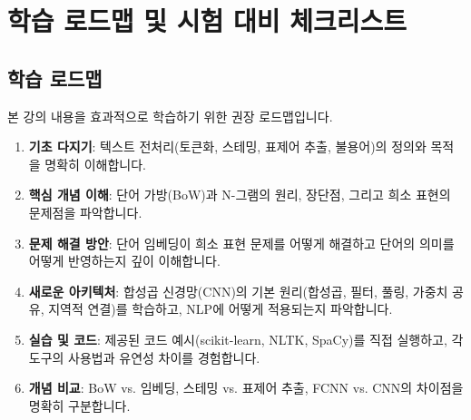 \documentclass[11pt,a4paper]{article}
\theoremstyle{definition}
\begin{document}
\newpage
\section{학습 로드맵 및 시험 대비 체크리스트}

\subsection{학습 로드맵}
본 강의 내용을 효과적으로 학습하기 위한 권장 로드맵입니다.
\begin{enumerate}
    \item \textbf{기초 다지기}: 텍스트 전처리(토큰화, 스테밍, 표제어 추출, 불용어)의 정의와 목적을 명확히 이해합니다.
    \item \textbf{핵심 개념 이해}: 단어 가방(BoW)과 N-그램의 원리, 장단점, 그리고 희소 표현의 문제점을 파악합니다.
    \item \textbf{문제 해결 방안}: 단어 임베딩이 희소 표현 문제를 어떻게 해결하고 단어의 의미를 어떻게 반영하는지 깊이 이해합니다.
    \item \textbf{새로운 아키텍처}: 합성곱 신경망(CNN)의 기본 원리(합성곱, 필터, 풀링, 가중치 공유, 지역적 연결)를 학습하고, NLP에 어떻게 적용되는지 파악합니다.
    \item \textbf{실습 및 코드}: 제공된 코드 예시(scikit-learn, NLTK, SpaCy)를 직접 실행하고, 각 도구의 사용법과 유연성 차이를 경험합니다.
    \item \textbf{개념 비교}: BoW vs. 임베딩, 스테밍 vs. 표제어 추출, FCNN vs. CNN의 차이점을 명확히 구분합니다.
\end{enumerate}
\end{document}
